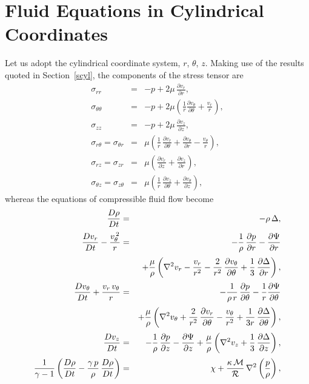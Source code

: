 \section{Fluid Equations in Cylindrical Coordinates}\label{s2.19}
Let us adopt the cylindrical coordinate system, $r$, $\theta$, $z$. Making use of the results quoted
in Section~\ref{scyl}, the components of the stress tensor are
\begin{eqnarray}
\sigma_{rr} &=&-p + 2\mu\,\frac{\partial v_r}{\partial r},\\[0.5ex]
\sigma_{\theta\theta} &=&-p + 2\mu\left(\frac{1}{r}\frac{\partial v_\theta}{\partial \theta}+ \frac{v_r}{r}\right),\\[0.5ex]
\sigma_{zz} &=&-p + 2\mu\,\frac{\partial v_z}{\partial z},\\[0.5ex]
\sigma_{r\theta}=\sigma_{\theta r} &=&\mu\left(\frac{1}{r}\,\frac{\partial v_r}{\partial\theta} + \frac{\partial v_\theta}{\partial r}-\frac{v_\theta}{r}\right),\\[0.5ex]
\sigma_{rz}=\sigma_{zr} &=&\mu\left(\frac{\partial v_r}{\partial z} + \frac{\partial v_z}{\partial r}\right),\\[0.5ex]
\sigma_{\theta z} = \sigma_{z\theta} &=& \mu\left(\frac{1}{r}\,\frac{\partial v_z}{\partial\theta}+\frac{\partial v_\theta}{\partial z}\right),
\end{eqnarray}
whereas the equations of compressible fluid flow become
\begin{eqnarray}
\frac{D\rho}{Dt} &=&-\rho\,\Delta,\\[0.5ex]
\frac{Dv_r}{Dt}-\frac{v_\theta^{\,2}}{r}&=& - \frac{1}{\rho}\,\frac{\partial p}{\partial r} - \frac{\partial\Psi}{\partial r}
\nonumber\\[0.5ex]&&+ \frac{\mu}{\rho}\left(\nabla^2 v_r -\frac{v_r}{r^2}-\frac{2}{r^2}\,\frac{\partial v_\theta}{\partial\theta}+ \frac{1}{3}\,\frac{\partial\Delta}{\partial r}\right),\\[0.5ex]
\frac{Dv_\theta}{Dt}+\frac{v_r\,v_\theta}{r}&=& - \frac{1}{\rho\,r}\,\frac{\partial p}{\partial \theta} - \frac{1}{r}\frac{\partial\Psi}{\partial \theta}\nonumber\\[0.5ex]&&
+\frac{\mu}{\rho}\left(\nabla^2 v_\theta +\frac{2}{r^2}\,\frac{\partial v_r}{\partial\theta} -\frac{v_\theta}{r^2}+ \frac{1}{3r}\,\frac{\partial\Delta}{\partial \theta}\right),\\[0.5ex]
\frac{Dv_z}{Dt}&=& - \frac{1}{\rho}\,\frac{\partial p}{\partial z} - \frac{\partial\Psi}{\partial z}
+ \frac{\mu}{\rho}\left(\nabla^2 v_z + \frac{1}{3}\,\frac{\partial\Delta}{\partial z}\right),\\[0.5ex]
\frac{1}{\gamma-1}\left(\frac{D\rho}{Dt} - \frac{\gamma\,p}{\rho}\,\frac{D\rho}{Dt}\right)
&=&\chi + \frac{\kappa\,{\cal M}}{\cal R}\,\nabla^2\left(\frac{p}{\rho}\right),
\end{eqnarray}
